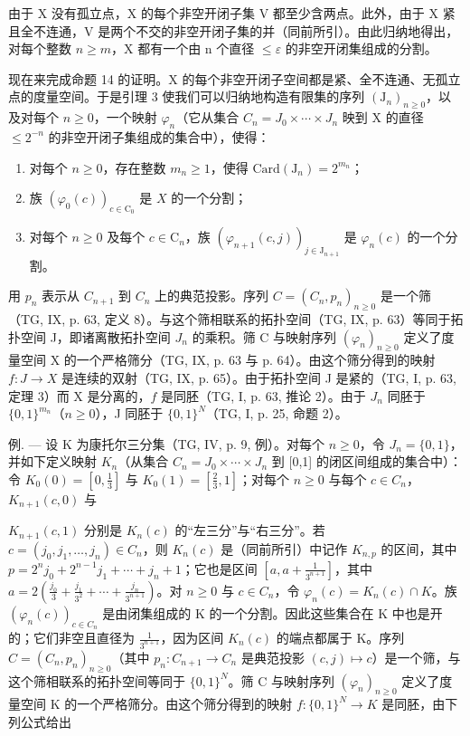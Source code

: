 由于 X 没有孤立点，X 的每个非空开闭子集 V 都至少含两点。此外，由于 X 紧且全不连通，V 是两个不交的非空开闭子集的并（同前所引）。由此归纳地得出，对每个整数 \(n \geqslant m\)，X 都有一个由 n 个直径 \(\leqslant \varepsilon\) 的非空开闭集组成的分割。

现在来完成命题 14 的证明。X 的每个非空开闭子空间都是紧、全不连通、无孤立点的度量空间。于是引理 3 使我们可以归纳地构造有限集的序列 \((\mathrm{J}_{n})_{n\geqslant0}\)，以及对每个 \(n\geqslant0\)，一个映射 \(\varphi_{n}\)（它从集合 \(C_{n}=J_{0}\times\cdots\times J_{n}\) 映到 X 的直径 \(\leqslant2^{-n}\) 的非空开闭子集组成的集合中），使得：

\begin{enumerate}
\def\labelenumi{(\roman{enumi})}
\item
  对每个 \(n \geqslant 0\)，存在整数 \(m_n \geqslant 1\)，使得 \(\mathrm{Card}(\mathrm{J}_n) = 2^{m_n}\)；
\item
  族 \((\varphi_0(c))_{c\in \mathrm{C}_0}\) 是 \(X\) 的一个分割；
\item
  对每个 \(n \geqslant 0\) 及每个 \(c \in \mathrm{C}_n\)，族 \((\varphi_{n+1}(c,j))_{j \in \mathrm{J}_{n+1}}\) 是 \(\varphi_n(c)\) 的一个分割。
\end{enumerate}

用 \(p_n\) 表示从 \(C_{n+1}\) 到 \(C_n\) 上的典范投影。序列 \(C = (C_n, p_n)_{n \geqslant 0}\) 是一个筛（TG, IX, p. 63, 定义 8）。与这个筛相联系的拓扑空间（TG, IX, p. 63）等同于拓扑空间 J，即诸离散拓扑空间 \(J_n\) 的乘积。筛 C 与映射序列 \((\varphi_n)_{n \geqslant 0}\) 定义了度量空间 X 的一个严格筛分（TG, IX, p. 63 与 p. 64）。由这个筛分得到的映射 \(f: J \to X\) 是连续的双射（TG, IX, p. 65）。由于拓扑空间 J 是紧的（TG, I, p. 63, 定理 3）而 X 是分离的，\(f\) 是同胚（TG, I, p. 63, 推论 2）。由于 \(J_n\) 同胚于 \(\{0, 1\}^{m_n}\)（\(n \geqslant 0\)），J 同胚于 \(\{0, 1\}^N\)（TG, I, p. 25, 命题 2）。

例. --- 设 K 为康托尔三分集（TG, IV, p. 9, 例）。对每个 \(n \geqslant 0\)，令 \(J_{n} = \{0,1\}\)，并如下定义映射 \(K_{n}\)（从集合 \(C_{n} = J_{0} \times \cdots \times J_{n}\) 到 {[}0,1{]} 的闭区间组成的集合中）：令 \(K_{0}(0) = [0, \frac{1}{3}]\) 与 \(K_{0}(1) = [\frac{2}{3}, 1]\)；对每个 \(n \geqslant 0\) 与每个 \(c \in C_{n}\)，\(K_{n+1}(c,0)\) 与

\(K_{n+1}(c,1)\) 分别是 \(K_n(c)\) 的“左三分”与“右三分”。若 \(c = (j_0,j_1,\ldots,j_n) \in C_n\)，则 \(K_n(c)\) 是（同前所引）中记作 \(K_{n,p}\) 的区间，其中 \(p = 2^n j_0 + 2^{n-1}j_1 + \cdots + j_n + 1\)；它也是区间 \([a,a + \frac{1}{3^{n+1}}]\)，其中 \(a = 2(\frac{j_0}{3} + \frac{j_1}{3^2} + \cdots + \frac{j_n}{3^{n+1}})\)。对 \(n \geqslant 0\) 与 \(c \in C_n\)，令 \(\varphi_n(c) = K_n(c) \cap K\)。族 \((\varphi_n(c))_{c \in C_n}\) 是由闭集组成的 K 的一个分割。因此这些集合在 K 中也是开的；它们非空且直径为 \(\frac{1}{3^{n+1}}\)，因为区间 \(K_n(c)\) 的端点都属于 K。序列 \(C = (C_n, p_n)_{n \geqslant 0}\)（其中 \(p_n: C_{n+1} \to C_n\) 是典范投影 \((c,j) \mapsto c\)）是一个筛，与这个筛相联系的拓扑空间等同于 \(\{0,1\}^N\)。筛 C 与映射序列 \((\varphi_n)_{n \geqslant 0}\) 定义了度量空间 K 的一个严格筛分。由这个筛分得到的映射 \(f: \{0,1\}^N \to K\) 是同胚，由下列公式给出

